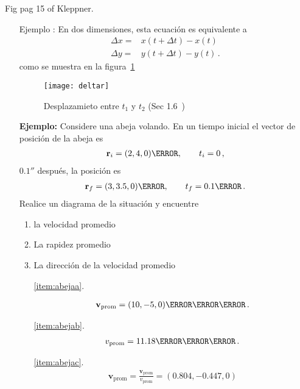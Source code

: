 \begin{inprogress}
  Fig pag 15 of Kleppner.
\end{inprogress}

\begin{itemize}
\item[Ejemplo]: En dos dimensiones, esta ecuaci\'on es equivalente a
  \begin{align}
    \Delta x=&x(t+\Delta t)-x(t)\nonumber\\
    \Delta y=&y(t+\Delta t)-y(t)\,.
  \end{align}
  como se muestra en la figura~\ref{fig:deltar}
  \begin{figure}
    \centering
    \texttt{[image: deltar]}
    \caption{Desplazamieto entre $t_1$ y $t_2$ (Sec 1.6~\cite{Kleppner})}
    \label{fig:deltar}
  \end{figure}

\end{itemize}


\begin{itemize}
\item[\textbf{Ejemplo:}] Considere una abeja volando. En un tiempo inicial el vector de posición de la abeja es
  \begin{align}
    \mathbf{r}_i=(2,4,0)\meter,\qquad t_i=0\,,
  \end{align}
$0.1\second$ después, la posición es
\begin{align}
  \mathbf{r}_f=(3,3.5,0)\meter,\qquad t_f=0.1\second\,.
\end{align}
Realice un diagrama de la situación y encuentre
\begin{enumerate}
\item la velocidad promedio
  \label{item:abejaa}
\item La rapidez promedio
  \label{item:abejab}
\item La dirección de la velocidad promedio
  \label{item:abejac}
\end{enumerate}
\begin{itemize}
\item[\ref{item:abejaa}.] 

\begin{align*}
  \mathbf{v}_{\text{prom}}=(10,-5,0)\meter\per\second\,.
\end{align*}

\item[\ref{item:abejab}.]
\begin{align*}
  v_{\text{prom}}=11.18\meter\per\second\,.
\end{align*}
\item[\ref{item:abejac}.]
  \begin{align*}
    \hat{\mathbf{v}}_{\text{prom}}=\frac{\mathbf{v}_{\text{prom}}}{v_{\text{prom}}}=(0.804,-0.447,0)
  \end{align*}

\end{itemize}
\end{itemize}

